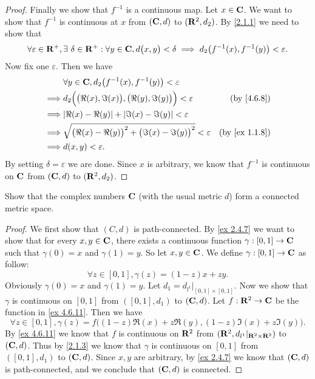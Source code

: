 \begin{proof}
  Finally we show that \(f^{-1}\) is a continuous map.
  Let \(x \in \mathbf{C}\).
  We want to show that \(f^{-1}\) is continuous at \(x\) from \((\mathbf{C}, d)\) to \((\mathbf{R}^2, d_2)\).
  By \cref{2.1.1} we need to show that
  \[
    \forall \varepsilon \in \mathbf{R}^+, \exists\ \delta \in \mathbf{R}^+ : \forall y \in \mathbf{C}, d\big(x, y\big) < \delta \implies d_2\big(f^{-1}(x), f^{-1}(y)\big) < \varepsilon.
  \]
  Now fix one \(\varepsilon\).
  Then we have
  \begin{align*}
             & \forall y \in \C, d_2\big(f^{-1}(x), f^{-1}(y)\big) < \varepsilon                                            \\
    \implies & d_2\Big(\big(\Re(x), \Im(x)\big), \big(\Re(y), \Im(y)\big)\Big) < \varepsilon  & \text{(by \cref{4.6.8})}    \\
    \implies & \abs{\Re(x) - \Re(y)} + \abs{\Im(x) - \Im(y)} < \varepsilon                                                  \\
    \implies & \sqrt{\big(\Re(x) - \Re(y)\big)^2 + \big(\Im(x) - \Im(y)\big)^2} < \varepsilon & \text{(by \cref{ex 1.1.8})} \\
    \implies & d(x, y) < \varepsilon.
  \end{align*}
  By setting \(\delta = \varepsilon\) we are done.
  Since \(x\) is arbitrary, we know that \(f^{-1}\) is continuous on \(\mathbf{C}\) from \((\mathbf{C}, d)\) to \((\mathbf{R}^2, d_2)\).
\end{proof}

\begin{exercise}\label{ex 4.6.12}
  Show that the complex numbers \(\mathbf{C}\) (with the usual metric \(d\)) form a connected metric space.
\end{exercise}

\begin{proof}
  We first show that \((C, d)\) is path-connected.
  By \cref{ex 2.4.7} we want to show that for every \(x, y \in \mathbf{C}\), there exists a continuous function \(\gamma : [0, 1] \to \mathbf{C}\) such that \(\gamma(0) = x\) and \(\gamma(1) = y\).
  So let \(x, y \in \mathbf{C}\).
  We define \(\gamma : [0, 1] \to \mathbf{C}\) as follow:
  \[
    \forall z \in [0, 1], \gamma(z) = (1 - z)x + zy.
  \]
  Obviously \(\gamma(0) = x\) and \(\gamma(1) = y\).
  Let \(d_1 = d_{l^1}|_{[0, 1] \times [0, 1]}\).
  Now we show that \(\gamma\) is continuous on \([0, 1]\) from \(([0, 1], d_1)\) to \((\mathbf{C}, d)\).
  Let \(f : \mathbf{R}^2 \to \mathbf{C}\) be the function in \cref{ex 4.6.11}.
  Then we have
  \[
    \forall z \in [0, 1], \gamma(z) = f\big((1 - z) \Re(x) + z \Re(y), (1 - z) \Im(x) + z \Im(y)\big).
  \]
  By \cref{ex 4.6.11} we know that \(f\) is continuous on \(\mathbf{R}^2\) from \((\mathbf{R}^2, d_{l^1}|_{\mathbf{R}^2 \times \mathbf{R}^2})\) to \((\mathbf{C}, d)\).
  Thus by \cref{2.1.3} we know that \(\gamma\) is continuous on \([0, 1]\) from \(([0, 1], d_1)\) to \((\mathbf{C}, d)\).
  Since \(x, y\) are arbitrary, by \cref{ex 2.4.7} we know that \((\mathbf{C}, d)\) is path-connected, and we conclude that \((\mathbf{C}, d)\) is connected.
\end{proof}


